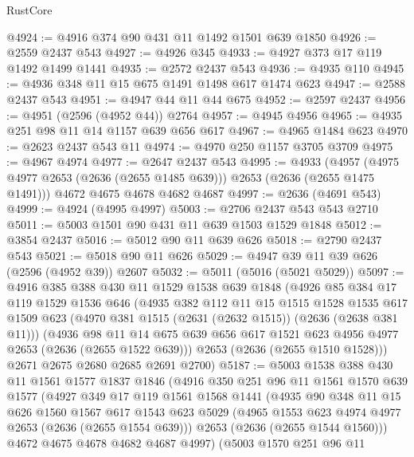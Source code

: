 \begin{lexlean}{RustCore}
\begin{coremodule}
@4924 := @4916 @374 @90 @431 @11 @1492 @1501 @639 @1850
@4926 := @2559 @2437 @543
@4927 := @4926 @345
@4933 := @4927 @373 @17 @119 @1492 @1499 @1441
@4935 := @2572 @2437 @543
@4936 := @4935 @110
@4945 := @4936 @348 @11 @15 @675 @1491 @1498 @617 @1474 @623
@4947 := @2588 @2437 @543
@4951 := @4947 @44 @11 @44 @675
@4952 := @2597 @2437
@4956 := @4951 (@2596 (@4952 @44)) @2764
@4957 := @4945 @4956
@4965 := @4935 @251 @98 @11 @14 @1157 @639 @656 @617
@4967 := @4965 @1484 @623
@4970 := @2623 @2437 @543 @11
@4974 := @4970 @250 @1157 @3705 @3709
@4975 := @4967 @4974
@4977 := @2647 @2437 @543
@4995 := @4933
    (@4957 (@4975 @4977 @2653 (@2636 (@2655 @1485 @639))) @2653 (@2636 (@2655 @1475 @1491)))
    @4672
    @4675
    @4678
    @4682
    @4687
@4997 := @2636 (@4691 @543)
@4999 := @4924 (@4995 @4997)
@5003 := @2706 @2437 @543 @543 @2710
@5011 := @5003 @1501 @90 @431 @11 @639 @1503 @1529 @1848
@5012 := @3854 @2437
@5016 := @5012 @90 @11 @639 @626
@5018 := @2790 @2437 @543
@5021 := @5018 @90 @11 @626
@5029 := @4947 @39 @11 @39 @626 (@2596 (@4952 @39)) @2607
@5032 := @5011 (@5016 (@5021 @5029))
@5097 := @4916
    @385
    @388
    @430
    @11
    @1529
    @1538
    @639
    @1848
    (@4926
      @85
      @384
      @17
      @119
      @1529
      @1536
      @646
      (@4935
        @382
        @112
        @11
        @15
        @1515
        @1528
        @1535
        @617
        @1509
        @623
        (@4970 @381 @1515 (@2631 (@2632 @1515)) (@2636 (@2638 @381 @11)))
        (@4936
          @98
          @11
          @14
          @675
          @639
          @656
          @617
          @1521
          @623
          @4956
          @4977
          @2653
          (@2636 (@2655 @1522 @639)))
        @2653
        (@2636 (@2655 @1510 @1528)))
      @2671
      @2675
      @2680
      @2685
      @2691
      @2700)
@5187 := @5003
    @1538
    @388
    @430
    @11
    @1561
    @1577
    @1837
    @1846
    (@4916
      @350
      @251
      @96
      @11
      @1561
      @1570
      @639
      @1577
      (@4927
        @349
        @17
        @119
        @1561
        @1568
        @1441
        (@4935
          @90
          @348
          @11
          @15
          @626
          @1560
          @1567
          @617
          @1543
          @623
          @5029
          (@4965 @1553 @623 @4974 @4977 @2653 (@2636 (@2655 @1554 @639)))
          @2653
          (@2636 (@2655 @1544 @1560)))
        @4672
        @4675
        @4678
        @4682
        @4687
        @4997)
      (@5003
        @1570
        @251
        @96
        @11

\end{coremodule}
\end{lexlean}
